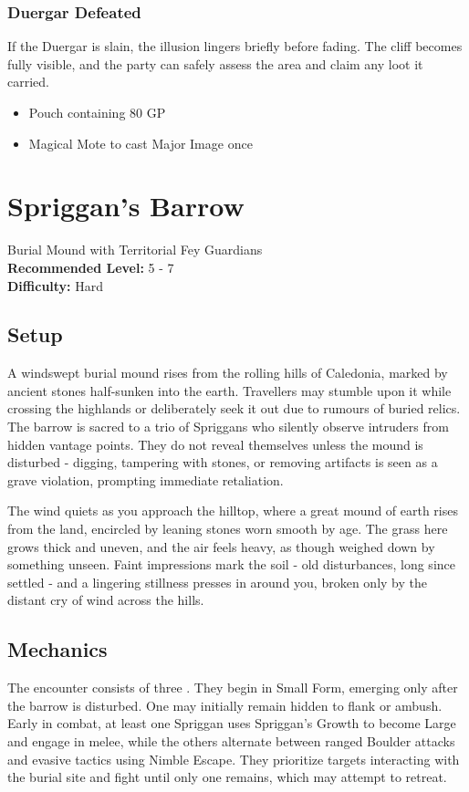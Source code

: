 \subsubsection*{Duergar Defeated}
{\entryfont If the Duergar is slain, the illusion lingers briefly before fading. The cliff becomes fully visible, and the party can safely assess the area and claim any loot it carried.
\begin{itemize}
	\item Pouch containing 80 GP
	\item Magical Mote to cast Major Image once
\end{itemize}}

\clearpage

\section*{Spriggan's Barrow}
{\entryfont Burial Mound with Territorial Fey Guardians\\
\textbf{Recommended Level:} 5 - 7\\
\textbf{Difficulty:} Hard}
\subsection*{Setup}
{\entryfont A windswept burial mound rises from the rolling hills of Caledonia, marked by ancient stones half-sunken into the earth. Travellers may stumble upon it while crossing the highlands or deliberately seek it out due to rumours of buried relics. The barrow is sacred to a trio of Spriggans who silently observe intruders from hidden vantage points. They do not reveal themselves unless the mound is disturbed - digging, tampering with stones, or removing artifacts is seen as a grave violation, prompting immediate retaliation.}
\begin{DndReadAloud}
	The wind quiets as you approach the hilltop, where a great mound of earth rises from the land, encircled by leaning stones worn smooth by age. The grass here grows thick and uneven, and the air feels heavy, as though weighed down by something unseen. Faint impressions mark the soil - old disturbances, long since settled - and a lingering stillness presses in around you, broken only by the distant cry of wind across the hills.
\end{DndReadAloud}

\subsection*{Mechanics}
{\entryfont The encounter consists of three \hyperref[monster:Spriggan]{}. They begin in Small Form, emerging only after the barrow is disturbed. One may initially remain hidden to flank or ambush. Early in combat, at least one Spriggan uses Spriggan's Growth to become Large and engage in melee, while the others alternate between ranged Boulder attacks and evasive tactics using Nimble Escape. They prioritize targets interacting with the burial site and fight until only one remains, which may attempt to retreat.}

